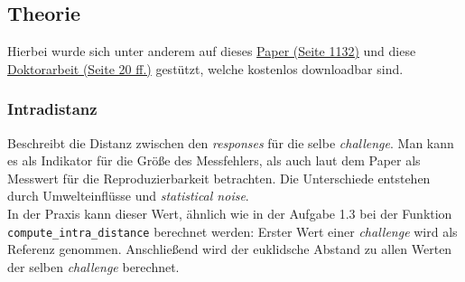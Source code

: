 \subsection{Theorie}

Hierbei wurde sich unter anderem auf dieses 
\href{https://ieeexplore.ieee.org/stamp/%
stamp.jsp?tp=&arnumber=6823677} %
{Paper (Seite 1132)} %
und diese 
\href{https://limo.libis.be/primo-explore/%
fulldisplay?docid=LIRIAS1662210&context%
=L&vid=Lirias&search_scope=Lirias&tab%
=default_tab&lang=en_US&fromSitemap=1}
{Doktorarbeit (Seite 20 ff.)}
gestützt, welche kostenlos downloadbar sind.

\subsubsection*{Intradistanz}
\begin{comment}
VL 5, Folie 36:
Distance between responses for the same challenges. 
Shows measurements error


Doktorarbeit, S.20:
A PUF response intra-distance is a random variable
describing the distance between two PUF responses 
from the same PUF instance and using
the same challenge

Paper, S. 1132:
Intra-PUF variation: Defined as the number of bits
in a PUF response that vary when an identical
challenge is repeatedly queried on a given PUF
device in a changing environment. This variation is
due to this environmental change as well as 
statistical noise. As a result, it is commonly 
represented in the form of a statistical 
distribution. Intra-PUF variation is a measure of 
the reproducibility of responses from an individual 
PUF circuit.
\end{comment}

Beschreibt die Distanz zwischen den
\textit{responses} für die selbe \textit{challenge}. 
Man kann es als Indikator für die Größe des Messfehlers,
als auch laut dem Paper als Messwert für die 
Reproduzierbarkeit betrachten. Die Unterschiede entstehen 
durch Umwelteinflüsse und \textit{statistical noise}.\\

In der Praxis kann dieser Wert, ähnlich wie in der 
Aufgabe 1.3 bei der Funktion
\verb|compute_intra_distance| berechnet werden: Erster 
Wert einer \textit{challenge} wird als Referenz 
genommen. Anschließend wird der euklidsche Abstand zu 
allen Werten der selben \textit{challenge} berechnet.


